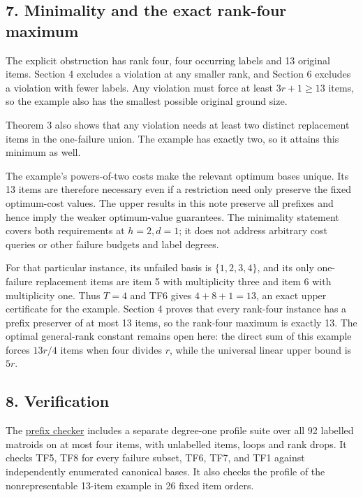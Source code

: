 \hypertarget{af-0a3ce40617-minimality-and-the-exact-rank-four-maximum}{%
\subsection{7. Minimality and the exact rank-four maximum}\label{af-0a3ce40617-minimality-and-the-exact-rank-four-maximum}}

The explicit obstruction has rank four, four occurring labels and 13 original items. Section 4 excludes a violation at any smaller rank, and Section 6 excludes a violation with fewer labels. Any violation must force at least \(3r+1\ge13\) items, so the example also has the smallest possible original ground size.

Theorem 3 also shows that any violation needs at least two distinct replacement items in the one-failure union. The example has exactly two, so it attains this minimum as well.

The example's powers-of-two costs make the relevant optimum bases unique. Its 13 items are therefore necessary even if a restriction need only preserve the fixed optimum-cost values. The upper results in this note preserve all prefixes and hence imply the weaker optimum-value guarantees. The minimality statement covers both requirements at \(h=2,d=1\); it does not address arbitrary cost queries or other failure budgets and label degrees.

For that particular instance, its unfailed basis is \(\{1,2,3,4\}\), and its only one-failure replacement items are item 5 with multiplicity three and item 6 with multiplicity one. Thus \(T=4\) and TF6 gives \(4+8+1=13\), an exact upper certificate for the example. Section 4 proves that every rank-four instance has a prefix preserver of at most 13 items, so the rank-four maximum is exactly 13. The optimal general-rank constant remains open here: the direct sum of this example forces \(13r/4\) items when four divides \(r\), while the universal linear upper bound is \(5r\).

\hypertarget{af-0a3ce40617-verification}{%
\subsection{8. Verification}\label{af-0a3ce40617-verification}}

The \href{https://github.com/icekylinx/algorithm-frontier/blob/main/problems/matroid-failure-summaries/verify/check_weighted_prefix.py}{prefix checker} includes a separate degree-one profile suite over all 92 labelled matroids on at most four items, with unlabelled items, loops and rank drops. It checks TF5, TF8 for every failure subset, TF6, TF7, and TF1 against independently enumerated canonical bases. It also checks the profile of the nonrepresentable 13-item example in 26 fixed item orders.

